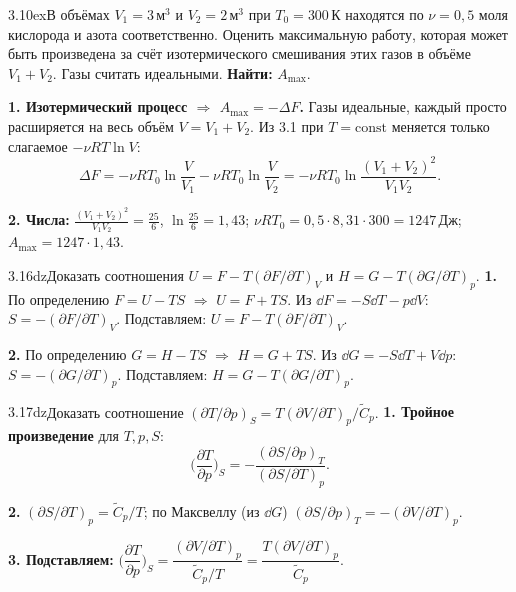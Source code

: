 \begin{problem}{3.10}{ex}{В объёмах $V_1=3$\,м$^3$ и $V_2=2$\,м$^3$ при $T_0=300$\,К находятся по $\nu=0{,}5$ моля кислорода и азота
соответственно. Оценить максимальную работу, которая может быть произведена за счёт изотермического смешивания этих газов в объёме
$V_1+V_2$. Газы считать идеальными.}
\textbf{Найти:} $A_{\max}$.

\textbf{1. Изотермический процесс $\Rightarrow$ $A_{\max}=-\Delta F$.} Газы идеальные, каждый просто расширяется на весь объём
$V=V_1+V_2$. Из 3.1 при $T=\mathrm{const}$ меняется только слагаемое $-\nu RT\ln V$:
\[\Delta F=-\nu RT_0\ln\frac V{V_1}-\nu RT_0\ln\frac V{V_2}=-\nu RT_0\ln\frac{(V_1+V_2)^2}{V_1V_2}.\]

\textbf{2. Числа:} $\frac{(V_1+V_2)^2}{V_1V_2}=\frac{25}6$, $\ln\frac{25}6=1{,}43$; $\nu RT_0=0{,}5\cdot8{,}31\cdot300=1247$\,Дж;
$A_{\max}=1247\cdot1{,}43$.
\end{problem}

\begin{problem}{3.16}{dz}{Доказать соотношения $U=F-T(\partial F/\partial T)_V$ и $H=G-T(\partial G/\partial T)_p$.}
\textbf{1.} По определению $F=U-TS$ $\Rightarrow$ $U=F+TS$. Из $\dd F=-S\dd T-p\dd V$: $S=-(\partial F/\partial T)_V$.
Подставляем: $U=F-T(\partial F/\partial T)_V$.

\textbf{2.} По определению $G=H-TS$ $\Rightarrow$ $H=G+TS$. Из $\dd G=-S\dd T+V\dd p$: $S=-(\partial G/\partial T)_p$.
Подставляем: $H=G-T(\partial G/\partial T)_p$.
\end{problem}

\begin{problem}{3.17}{dz}{Доказать соотношение $(\partial T/\partial p)_S=T(\partial V/\partial T)_p/\widetilde C_p$.}
\textbf{1. Тройное произведение} для $T,p,S$:
\[\Big(\frac{\partial T}{\partial p}\Big)_S=-\frac{(\partial S/\partial p)_T}{(\partial S/\partial T)_p}.\]

\textbf{2.} $(\partial S/\partial T)_p=\widetilde C_p/T$; по Максвеллу (из $\dd G$) $(\partial S/\partial p)_T=-(\partial V/\partial T)_p$.

\textbf{3. Подставляем:} $\Big(\dfrac{\partial T}{\partial p}\Big)_S=\dfrac{(\partial V/\partial T)_p}{\widetilde C_p/T}=\dfrac{T(\partial V/\partial T)_p}{\widetilde C_p}$.
\end{problem}

